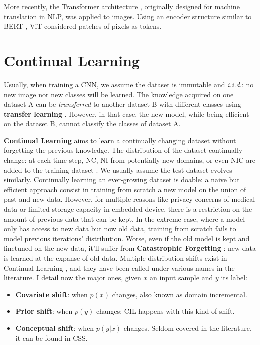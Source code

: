 More recently, the Transformer architecture \citep{vaswani2017transformer}, originally designed for
machine translation in \ac{NLP}, was applied to images. Using an encoder structure similar to BERT
\citep{devlin2018bert}, ViT \citep{dosovitskiy2020vit} considered patches of pixels as tokens.

\section{Continual Learning}
\label{sec:related_continual}

Usually, when training a \ac{CNN}, we assume the dataset is immutable and \textit{i.i.d.}: no new
image nor new classes will be learned. The knowledge acquired on one dataset A can be
\textit{transferred} to another dataset B with different classes using \textbf{transfer learning}
\citep{razavian2014transferlearning}. However, in that case, the new model, while being efficient on
the dataset B, cannot classify the classes of dataset A.

\textbf{Continual Learning} aims to learn a continually changing dataset without forgetting the
previous knowledge. The distribution of the dataset continually change: at each time-step, \ac{NC},
\ac{NI} from potentially new domains, or even \ac{NIC} are added to the training dataset
\cite{lomonaco2017core50}. We usually assume the test dataset evolves similarly. Continually
learning an ever-growing dataset is doable: a naive but efficient approach consist in training from
scratch a new model on the union of past and new data. However, for multiple reasons like privacy
concerns of medical data or limited storage capacity in embedded device, there is a restriction on
the amount of previous data that can be kept. In the extreme case, where a model only has access to
new data but now old data, training from scratch fails to model previous iterations' distribution.
Worse, even if the old model is kept and finetuned on the new data, it'll suffer from
\textbf{Catastrophic Forgetting} \citep{robins1995catastrophicforgetting}: new data is learned at
the expanse of old data. Multiple distribution shifts exist in Continual Learning
\citep{morenotorresa2012datasetshift,lesort2021driftanalysis}, and they have been called under various names in the
literature. I detail now the major ones, given $x$ an input sample and $y$ its label:

\begin{itemize}
      \item \textbf{Covariate shift}: when $p(x)$ changes, also known as domain incremental.
      \item \textbf{Prior shift}: when $p(y)$ changes; \ac{CIL} happens with this kind of shift.
      \item \textbf{Conceptual shift}: when $p(y | x)$ changes. Seldom covered in the literature, it
            can be found in \acf{CSS}.
\end{itemize}

